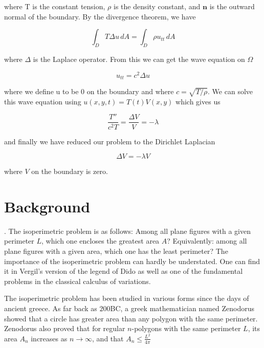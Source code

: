 \documentclass[12pt]{report}
\numberwithin{definition}{section}
\begin{document}
where T is the constant tension, $\rho$ is the density constant, and $\textbf{n}$ is the outward normal of the boundary.
By the divergence theorem, we have

$$ \int_{D} T \Delta u \, dA = \int_{D} \rho u_{tt} \, dA $$

where $\Delta$ is the Laplace operator. From this we can get the wave equation on $\Omega$

$$ u_{tt} = c^{2} \Delta u $$

where we define u to be 0 on the boundary and where $c = \sqrt{T / \rho}$.
We can solve this wave equation using $u(x,y,t) = T(t)V(x,y)$ which gives us

$$ \frac{T''}{c^{2}T} = \frac{\Delta V}{V} = - \lambda $$

and finally we have reduced our problem to the Dirichlet Laplacian

$$ \Delta V = - \lambda V $$

where $V$ on the boundary is zero.






\break


\section{Background}
.
The isoperimetric problem is as follows: Among all plane figures with a given perimeter $L$, which one encloses the greatest area $A$?
Equivalently: among all plane figures with a given area, which one has the least perimeter?
The importance of the isoperimetric problem can hardly be understated.
One can find it in Vergil's version of the legend of Dido as well as one of the fundamental problems in the classical calculus of variations.


The isoperimetric problem has been studied in various forms since the days of ancient greece. 
As far back as $200$BC, a greek mathematician named Zenodorus showed that a circle has greater area than any polygon with the same perimeter\cite{pappus}.
Zenodorus also proved that for regular $n $-polygons with the same perimeter $L$, its area $A_{n}$ increases as $n \to \infty$, and that $A_{n} \leq \frac{L^{2}}{4\pi}$
\end{document}
